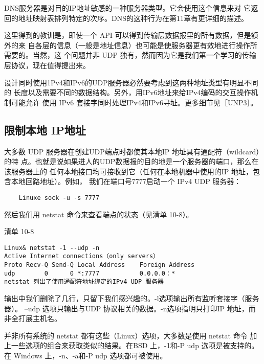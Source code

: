 \begin{tcolorbox}    
DNS服务器是对目的IP地址敏感的一种服务器类型。它会使用这个信息来对
它返回的地址映射表排列特定的次序。DNS的这种行为在第11章有更详细的描述。
\end{tcolorbox}

这里得到的教训是，即使一个 API 可以得到传输层数据报里的所有数据，但是额外的来
自各层的信息（一般是地址信息）也可能是使服务器更有效地进行操作所需要的。当然，这
个问题并非 UDP 独有，然而因为它是我们第一个学习的传输层协议，现在值得提出来。

设计同时使用1Pv4和IPv6的UDP服务器必然要考虑到这两种地址类型有明显不同的
长度以及需要不同的数据结构。另外，用IPv6地址来给IPv4编码的交互操作机制可能允许
使用 IPv6 套接字同时处理IPv4和IPv6寻址。更多细节见［UNP3］。

\subsection{限制本地 IP地址}
大多数 UDP 服务器在创建UDP端点时都使其本地IP 地址具有通配符（wildcard）的特
点。也就是说如果进人的UDP数据报的目的地是一个服务器的端口，那么在该服务器上的
任何本地接口均可接收到它（任何在本地机器中使用的IP 地址，包含本地回路地址）。例如，
我们在端口号7777启动一个 IPv4 UDP 服务器：

\begin{verbatim}
    Linuxe sock -u -s 7777
\end{verbatim}

然后我们用 netstat 命令来查看端点的状态（见清单 10-8）。

清单 10-8

\begin{verbatim}
Linux& netstat -1 --udp -n
Active Internet connections（only servers）
Proto Recv-Q Send-Q Local Address    Foreign Address
udp        0      0 *:7777           0.0.0.0：*
netstat 列出了使用通配符地址绑定的IPv4 UDP 服务器
\end{verbatim}

输出中我们删除了几行，只留下我们感兴趣的。-l选项输出所有监听套接字（服务器）。
--udp 选项只输出与UDP 协议相关的数据。-n选项指明只打印IP 地址，而非全打展主机名。

\begin{tcolorbox}
    并非所有系统的 netstat 都有这些（Linux）选项，大多数是使用 netstat 命令
    加上一些选项的组合来获取类似的结果。在BSD 上，-1和-P udp 选项是被支持的。
    在 Windows 上，-n、-a和-P udp 选项都可被使用。
\end{tcolorbox}

